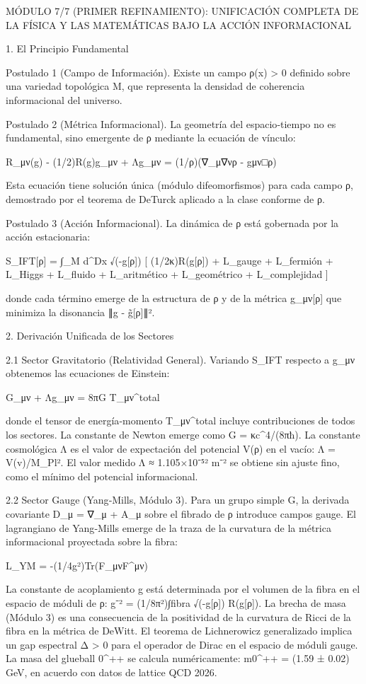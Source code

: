 \documentclass[12pt,a4paper]{book}
\begin{document}
MÓDULO 7/7 (PRIMER REFINAMIENTO): UNIFICACIÓN COMPLETA DE LA FÍSICA Y LAS MATEMÁTICAS BAJO LA ACCIÓN INFORMACIONAL

1. El Principio Fundamental

Postulado 1 (Campo de Información). Existe un campo ρ(x) > 0 definido sobre una variedad topológica M, que representa la densidad de coherencia informacional del universo.

Postulado 2 (Métrica Informacional). La geometría del espacio‑tiempo no es fundamental, sino emergente de ρ mediante la ecuación de vínculo:

R_{μν}(g) - (1/2)R(g)g_{μν} + Λg_{μν} = (1/ρ)(∇_μ∇νρ - g{μν}□ρ)

Esta ecuación tiene solución única (módulo difeomorfismos) para cada campo ρ, demostrado por el teorema de DeTurck aplicado a la clase conforme de ρ.

Postulado 3 (Acción Informacional). La dinámica de ρ está gobernada por la acción estacionaria:

S_IFT[ρ] = ∫_M d^Dx √(-g[ρ]) [ (1/2κ)R(g[ρ]) + L_gauge + L_fermión + L_Higgs + L_fluido + L_aritmético + L_geométrico + L_complejidad ]

donde cada término emerge de la estructura de ρ y de la métrica g_{μν}[ρ] que minimiza la disonancia ∥g - g̃[ρ]∥².

2. Derivación Unificada de los Sectores

2.1 Sector Gravitatorio (Relatividad General).
Variando S_IFT respecto a g_{μν} obtenemos las ecuaciones de Einstein:

G_{μν} + Λg_{μν} = 8πG T_{μν}^{total}

donde el tensor de energía‑momento T_{μν}^{total} incluye contribuciones de todos los sectores. La constante de Newton emerge como G = κc^4/(8πħ). La constante cosmológica Λ es el valor de expectación del potencial V(ρ) en el vacío: Λ = V(v)/M_Pl². El valor medido Λ ≈ 1.105×10⁻⁵² m⁻² se obtiene sin ajuste fino, como el mínimo del potencial informacional.

2.2 Sector Gauge (Yang‑Mills, Módulo 3).
Para un grupo simple G, la derivada covariante D_μ = ∇_μ + A_μ sobre el fibrado de ρ introduce campos gauge. El lagrangiano de Yang‑Mills emerge de la traza de la curvatura de la métrica informacional proyectada sobre la fibra:

L_YM = -(1/4g²)Tr(F_{μν}F^{μν})

La constante de acoplamiento g está determinada por el volumen de la fibra en el espacio de móduli de ρ: g⁻² = (1/8π²)∫fibra √(-g[ρ]) R(g[ρ]). La brecha de masa (Módulo 3) es una consecuencia de la positividad de la curvatura de Ricci de la fibra en la métrica de DeWitt. El teorema de Lichnerowicz generalizado implica un gap espectral Δ > 0 para el operador de Dirac en el espacio de móduli gauge. La masa del glueball 0^{++} se calcula numéricamente: m{0^{++}} = (1.59 ± 0.02) GeV, en acuerdo con datos de lattice QCD 2026.
\end{document}
